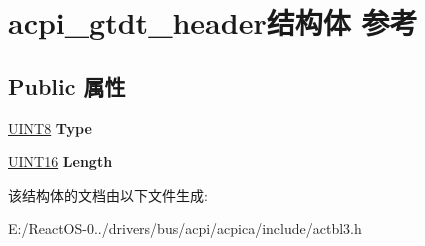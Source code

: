 \hypertarget{structacpi__gtdt__header}{}\section{acpi\+\_\+gtdt\+\_\+header结构体 参考}
\label{structacpi__gtdt__header}
\subsection*{Public 属性}
\begin{DoxyCompactItemize}
\item 
\mbox{\label{structacpi__gtdt__header_a052afdf399fdbb16dc9150e54f941317}} 
\hyperlink{_processor_bind_8h_ab27e9918b538ce9d8ca692479b375b6a}{U\+I\+N\+T8} {\bfseries Type}
\item 
\mbox{\label{structacpi__gtdt__header_af7d1bd2e84005e1e299b3d204511d849}} 
\hyperlink{_processor_bind_8h_a09f1a1fb2293e33483cc8d44aefb1eb1}{U\+I\+N\+T16} {\bfseries Length}
\end{DoxyCompactItemize}


该结构体的文档由以下文件生成\+:\begin{DoxyCompactItemize}
\item 
E\+:/\+React\+O\+S-\/0../drivers/bus/acpi/acpica/include/actbl3.\+h\end{DoxyCompactItemize}
